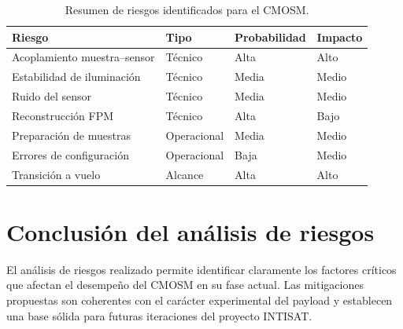 \begin{table}[H]
\centering
\begin{tabular}{p{4cm} p{3cm} p{3cm} p{3cm}}
\toprule
\textbf{Riesgo} & \textbf{Tipo} & \textbf{Probabilidad} & \textbf{Impacto} \\
\midrule
Acoplamiento muestra--sensor & Técnico & Alta & Alto \\
Estabilidad de iluminación & Técnico & Media & Medio \\
Ruido del sensor & Técnico & Media & Medio \\
Reconstrucción FPM & Técnico & Alta & Bajo \\
Preparación de muestras & Operacional & Media & Medio \\
Errores de configuración & Operacional & Baja & Medio \\
Transición a vuelo & Alcance & Alta & Alto \\
\bottomrule
\end{tabular}
\caption{Resumen de riesgos identificados para el CMOSM.}
\end{table}

\section{Conclusión del análisis de riesgos}

El análisis de riesgos realizado permite identificar claramente los factores
críticos que afectan el desempeño del CMOSM en su fase actual. Las mitigaciones
propuestas son coherentes con el carácter experimental del payload y establecen
una base sólida para futuras iteraciones del proyecto INTISAT.
